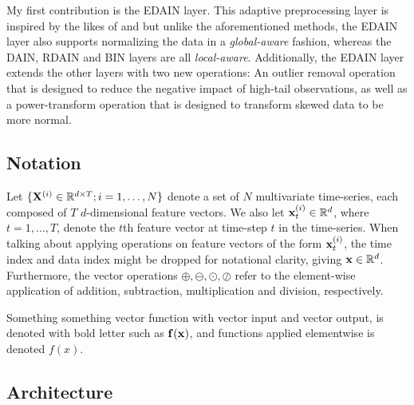 \documentclass{statsmsc}
\begin{document}
My first contribution is the \ac{EDAIN} layer. This adaptive preprocessing layer is inspired
by the likes of \citep{dain}  and \citep{bin} but unlike the aforementioned methods, the
\ac{EDAIN} layer also supports normalizing the data in a \textit{global-aware} fashion, whereas
the \ac{DAIN}, \ac{RDAIN} and \ac{BIN} layers are all \textit{local-aware}.
Additionally, the \ac{EDAIN} layer extends the other layers with two new operations: An outlier
removal operation that is designed to reduce the negative impact of high-tail observations,
as well as a power-transform operation that is designed to transform skewed data to be more
normal.

\subsection{Notation}%
\label{sub:Notation}


Let $\{\mathbf{X}^{(i)} \in \mathbb{R}^{d \times T};i=1,\dots,N\}$ denote a set of $N$ multivariate time-series,
each composed of $T$ $d$-dimensional feature vectors. We also let $\mathbf{x}_t^{(i)}\in \mathbb{R}^d$,
where $t=1,\dots,T$, denote the $t$th feature vector at time-step $t$ in the time-series.
When talking about applying operations on feature vectors of the form $\mathbf{x}_t^{(i)}$, the time index and data index might
be dropped for notational clarity, giving $\mathbf{x} \in \mathbb{R}^d$. Furthermore, the vector operations
$\oplus, \ominus, \odot, \oslash$ refer to the element-wise
application of addition, subtraction, multiplication and division, respectively.

Something something vector function with vector input and vector output, is denoted with bold
letter such as $\mathbf{f}(\mathbf{x})$, and functions applied elementwise is denoted $f(x)$.

\subsection{Architecture}%
\label{sub:Architecture}
\end{document}
